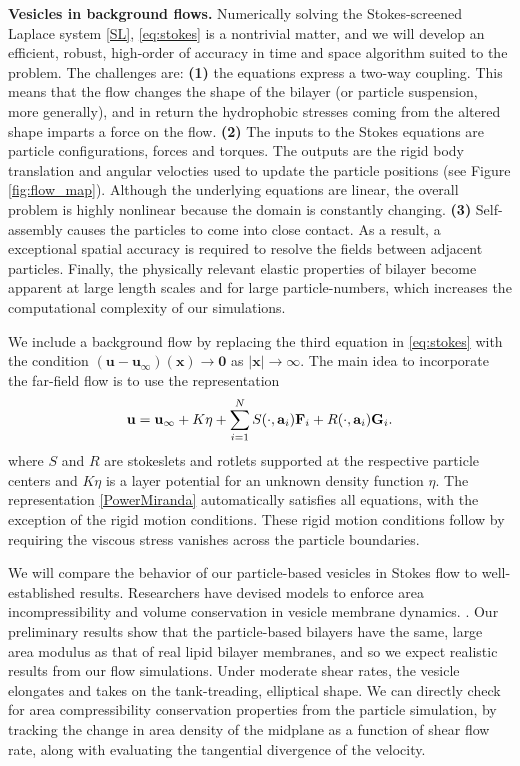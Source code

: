 \textbf{Vesicles in background flows.}
Numerically solving the Stokes-screened Laplace system \eqref{SL}, \eqref{eq:stokes} is a nontrivial matter,
and we will develop an efficient, robust, high-order of accuracy in time and space algorithm suited to the problem. 
The challenges are: \textbf{(1)} the equations express a two-way coupling.
This means that the flow changes the shape of the bilayer (or particle suspension, more generally),
and in return the hydrophobic stresses coming from the altered shape imparts a force on the flow. 
\textbf{(2)}
The inputs to the Stokes equations are particle configurations, forces and torques. 
The outputs are the rigid body translation and angular velocties used to update the particle positions (see Figure \ref{fig:flow_map}).
Although the underlying equations are linear, the overall problem is highly nonlinear because the domain is constantly changing.
\textbf{(3)} Self-assembly causes the particles to come into close contact.  
As a result, a exceptional spatial accuracy is required to resolve the fields between adjacent particles.
Finally, the physically relevant elastic properties of bilayer become apparent at large length scales and for large particle-numbers,
which increases the computational complexity of our simulations. 

We include a background flow by replacing the third equation in \eqref{eq:stokes} with the condition
$(\mathbf{u} - \mathbf{u}_{\infty})(\mathbf{x}) \to \mathbf{0}$ as $|\mathbf{x}| \to \infty.$ 
The main idea to incorporate the far-field flow is to use the representation 
\begin{equation}
\label{PowerMiranda}
{\bf u} = {\bf u}_{\infty} + K\eta + \sum_{i=1}^N S(\cdot, {\bf a}_i) {\bf F}_i + R(\cdot, {\bf a}_i) {\bf G}_i.
\end{equation}
where $S$ and $R$ are stokeslets and rotlets supported at the respective particle centers 
and $K\eta$ is a layer potential for an unknown density function $\eta.$ 
The representation \eqref{PowerMiranda} automatically satisfies all equations, with the exception of the rigid motion conditions. 
These rigid motion conditions follow by requiring the viscous stress vanishes across the particle boundaries.

We will compare the behavior of our particle-based vesicles in Stokes flow to well-established results.
Researchers have devised models to enforce area incompressibility and
volume conservation in vesicle membrane dynamics. 
\cite{torres-sanchez_millan_arroyo_2019, mahapatra_saintillan_rangamani_2020, Steigmann99, C6SM02452A}.
Our preliminary results show that the particle-based bilayers have the same, large area modulus as that of real lipid bilayer membranes,
and so we expect realistic results from our flow simulations.
Under moderate shear rates, the vesicle elongates and takes on the tank-treading, elliptical shape.
We can directly check for area compressibility conservation properties from the particle simulation,
by tracking the change in area density of the midplane as a function of shear flow rate,  
along with evaluating the tangential divergence of the velocity.


